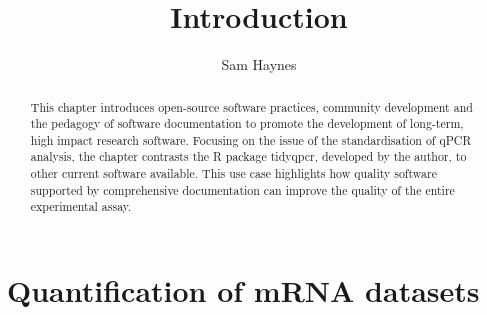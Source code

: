 \documentclass{SBCbookchapter}
\author{Sam Haynes}
\title{Introduction}
\begin{document}
\maketitle

\begin{abstract}
This chapter introduces open-source software practices, community development and the pedagogy of software documentation to promote the development of long-term, high impact research software. Focusing on the issue of the standardisation of qPCR analysis, the chapter contrasts the R package tidyqpcr, developed by the author, to other current software available. This use case highlights how quality software supported by comprehensive documentation can improve the quality of the entire experimental assay.


\end{abstract}

\section{Quantification of mRNA datasets}
\end{document}
